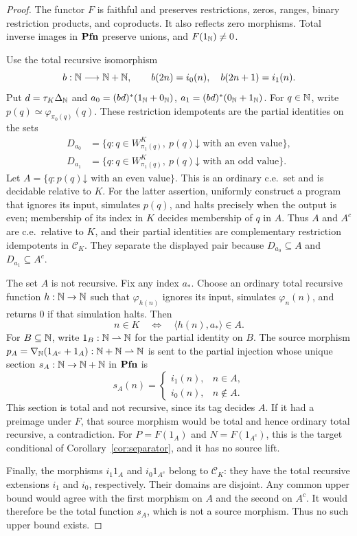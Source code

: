 \begin{proof}
The functor $F$ is faithful and preserves restrictions, zeros,
ranges, binary restriction products, and coproducts. It also reflects
zero morphisms. Total inverse images in $\mathbf{Pfn}$ preserve unions,
and $F(1_{\mathbb N})\ne0$.

Use the total recursive isomorphism
\[
 b:\mathbb N\longrightarrow\mathbb N+\mathbb N,\qquad
 b(2n)=i_0(n),\quad b(2n+1)=i_1(n).
\]
Put $d=\tau_K\Delta_{\mathbb N}$ and
$a_0=(bd)^*(1_{\mathbb N}+0_{\mathbb N})$,
$a_1=(bd)^*(0_{\mathbb N}+1_{\mathbb N})$.
For $q\in\mathbb N$, write
$p(q)\simeq\varphi_{\pi_0(q)}(q)$. These restriction idempotents
are the partial identities on the sets
\[
 \begin{aligned}
 D_{a_0}&=\{q:q\in W_{\pi_1(q)}^K,
                    \ p(q)\mathord\downarrow\text{ with an even value}\},\\
 D_{a_1}&=\{q:q\in W_{\pi_1(q)}^K,
                    \ p(q)\mathord\downarrow\text{ with an odd value}\}.
 \end{aligned}
\]
Let $A=\{q:p(q)\mathord\downarrow\text{ with an even value}\}$.
This is an ordinary c.e.\ set and is decidable relative to $K$.
For the latter assertion, uniformly construct a program that ignores
its input, simulates $p(q)$, and halts precisely when the output is
even; membership of its index in $K$ decides membership of $q$ in $A$.
Thus $A$ and $A^c$ are c.e.\ relative to $K$, and their partial
identities are complementary restriction idempotents in $\mathcal C_K$.
They separate the displayed pair because
$D_{a_0}\subseteq A$ and $D_{a_1}\subseteq A^c$.

The set $A$ is not recursive. Fix any index $a_*$. Choose an ordinary
total recursive function $h:\mathbb N\to\mathbb N$ such that $\varphi_{h(n)}$
ignores its input, simulates $\varphi_n(n)$, and returns $0$ if that
simulation halts. Then
\[
 n\in K\quad\Longleftrightarrow\quad
 \langle h(n),a_*\rangle\in A.
\]
For $B\subseteq\mathbb N$, write $1_B:\mathbb N\rightharpoonup\mathbb N$ for the
partial identity on $B$. The source morphism
$p_A=\nabla_{\mathbb N}(1_{A^c}+1_A):\mathbb N+\mathbb N\rightharpoonup\mathbb N$
is sent to the partial injection whose unique section
$s_A:\mathbb N\to\mathbb N+\mathbb N$ in $\mathbf{Pfn}$ is
\[
 s_A(n)=
 \begin{cases}
  i_1(n),&n\in A,\\
  i_0(n),&n\notin A.
 \end{cases}
\]
This section is total and not recursive, since its tag decides $A$.
If it had a preimage under $F$, that source morphism would
be total and hence ordinary total recursive, a contradiction.
For $P=F(1_A)$ and $N=F(1_{A^c})$, this is the target conditional
of Corollary~\ref{cor:separator}, and it has no source lift.

Finally, the morphisms $i_1 1_A$ and $i_0 1_{A^c}$ belong to
$\mathcal C_K$: they have the total recursive extensions $i_1$
and $i_0$, respectively. Their domains are disjoint. Any common
upper bound would agree with the first morphism on $A$ and the second
on $A^c$. It would therefore be the total function $s_A$, which
is not a source morphism. Thus no such upper bound exists.
\end{proof}


